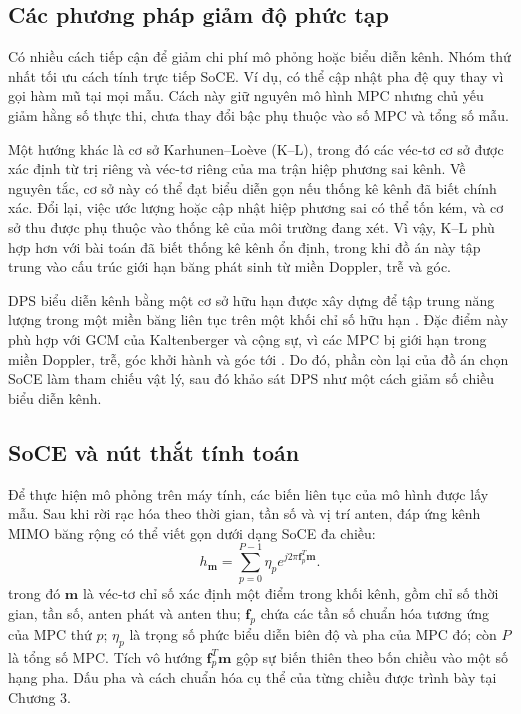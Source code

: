 \subsection{Các phương pháp giảm độ phức tạp}
\label{subsec:ch1_low_complexity_methods}

Có nhiều cách tiếp cận để giảm chi phí mô phỏng hoặc biểu diễn kênh. Nhóm thứ nhất tối ưu cách tính trực tiếp SoCE. Ví dụ, có thể cập nhật pha đệ quy thay vì gọi hàm mũ tại mọi mẫu. Cách này giữ nguyên mô hình MPC nhưng chủ yếu giảm hằng số thực thi, chưa thay đổi bậc phụ thuộc vào số MPC và tổng số mẫu.

Một hướng khác là cơ sở Karhunen--Loève (K--L), trong đó các véc-tơ cơ sở được xác định từ trị riêng và véc-tơ riêng của ma trận hiệp phương sai kênh. Về nguyên tắc, cơ sở này có thể đạt biểu diễn gọn nếu thống kê kênh đã biết chính xác. Đổi lại, việc ước lượng hoặc cập nhật hiệp phương sai có thể tốn kém, và cơ sở thu được phụ thuộc vào thống kê của môi trường đang xét. Vì vậy, K--L phù hợp hơn với bài toán đã biết thống kê kênh ổn định, trong khi đồ án này tập trung vào cấu trúc giới hạn băng phát sinh từ miền Doppler, trễ và góc.

DPS biểu diễn kênh bằng một cơ sở hữu hạn được xây dựng để tập trung năng lượng trong một miền băng liên tục trên một khối chỉ số hữu hạn \cite{Slepian1978}. Đặc điểm này phù hợp với GCM của Kaltenberger và cộng sự, vì các MPC bị giới hạn trong miền Doppler, trễ, góc khởi hành và góc tới \cite{Kaltenberger2007}. Do đó, phần còn lại của đồ án chọn SoCE làm tham chiếu vật lý, sau đó khảo sát DPS như một cách giảm số chiều biểu diễn kênh.

\subsection{SoCE và nút thắt tính toán}
\label{subsec:ch1_soce_bottleneck}

Để thực hiện mô phỏng trên máy tính, các biến liên tục của mô hình được lấy mẫu. Sau khi rời rạc hóa theo thời gian, tần số và vị trí anten, đáp ứng kênh MIMO băng rộng có thể viết gọn dưới dạng SoCE đa chiều:
\begin{equation}
h_{\mathbf{m}}
= \sum_{p=0}^{P-1}\eta_p e^{j2\pi\mathbf{f}_p^T\mathbf{m}}.
\label{eq:ch1_soc_compact}
\end{equation}
trong đó \(\mathbf{m}\) là véc-tơ chỉ số xác định một điểm trong khối kênh, gồm chỉ số thời gian, tần số, anten phát và anten thu; \(\mathbf{f}_p\) chứa các tần số chuẩn hóa tương ứng của MPC thứ \(p\); \(\eta_p\) là trọng số phức biểu diễn biên độ và pha của MPC đó; còn \(P\) là tổng số MPC. Tích vô hướng \(\mathbf{f}_p^T\mathbf{m}\) gộp sự biến thiên theo bốn chiều vào một số hạng pha. Dấu pha và cách chuẩn hóa cụ thể của từng chiều được trình bày tại Chương 3.

